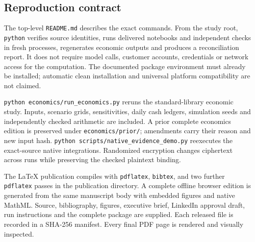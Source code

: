 \subsection{Reproduction contract}
The top-level \texttt{README.md} describes the exact commands. From the study root, \texttt{python}  verifies source identities, runs delivered notebooks and independent checks in fresh processes, regenerates economic outputs and produces a reconciliation report. It does not require model calls, customer accounts, credentials or network access for the computation. The documented package environment must already be installed; automatic clean installation and universal platform compatibility are not claimed.

\texttt{python economics/run\_economics.py} reruns the standard-library economic study. Inputs, scenario grids, sensitivities, daily cash ledgers, simulation seeds and independently checked arithmetic are included. A prior complete economics edition is preserved under \texttt{economics/prior/}; amendments carry their reason and new input hash. \texttt{python scripts/native\_evidence\_demo.py} reexecutes the exact-source native integrations. Randomized encryption changes ciphertext across runs while preserving the checked plaintext binding.

The LaTeX publication compiles with \texttt{pdflatex}, \texttt{bibtex}, and two further \texttt{pdflatex} passes in the publication directory. A complete offline browser edition is generated from the same manuscript body with embedded figures and native MathML. Source, bibliography, figures, executive brief, LinkedIn approval draft, run instructions and the complete package are supplied. Each released file is recorded in a SHA-256 manifest. Every final PDF page is rendered and visually inspected.

